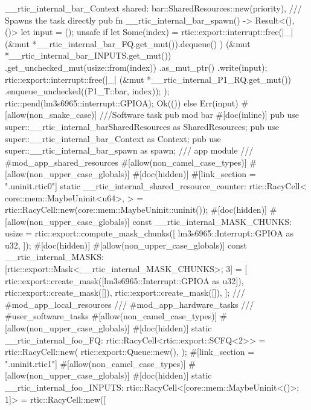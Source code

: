 {{{            __rtic_internal_bar_Context {
                shared: bar::SharedResources::new(priority),
            }
        }
    }
    /// Spawns the task directly
    pub fn __rtic_internal_bar_spawn() -> Result<(), ()> {
        let input = ();
        unsafe {
            if let Some(index) = rtic::export::interrupt::free(|_| {
                (&mut *__rtic_internal_bar_FQ.get_mut()).dequeue()
            }) {
                (&mut *__rtic_internal_bar_INPUTS.get_mut())
                    .get_unchecked_mut(usize::from(index))
                    .as_mut_ptr()
                    .write(input);
                rtic::export::interrupt::free(|_| {
                    (&mut *__rtic_internal_P1_RQ.get_mut())
                        .enqueue_unchecked((P1_T::bar, index));
                });
                rtic::pend(lm3s6965::interrupt::GPIOA);
                Ok(())
            } else {
                Err(input)
            }
        }
    }
    #[allow(non_snake_case)]
    ///Software task
    pub mod bar {
        #[doc(inline)]
        pub use super::__rtic_internal_barSharedResources as SharedResources;
        pub use super::__rtic_internal_bar_Context as Context;
        pub use super::__rtic_internal_bar_spawn as spawn;
    }
    /// app module
    /// #mod_app_shared_resources
    #[allow(non_camel_case_types)]
    #[allow(non_upper_case_globals)]
    #[doc(hidden)]
    #[link_section = ".uninit.rtic0"]
    static __rtic_internal_shared_resource_counter: rtic::RacyCell<
        core::mem::MaybeUninit<u64>,
    > = rtic::RacyCell::new(core::mem::MaybeUninit::uninit());
    #[doc(hidden)]
    #[allow(non_upper_case_globals)]
    const __rtic_internal_MASK_CHUNKS: usize = rtic::export::compute_mask_chunks([
        lm3s6965::Interrupt::GPIOA as u32,
    ]);
    #[doc(hidden)]
    #[allow(non_upper_case_globals)]
    const __rtic_internal_MASKS: [rtic::export::Mask<__rtic_internal_MASK_CHUNKS>; 3] = [
        rtic::export::create_mask([lm3s6965::Interrupt::GPIOA as u32]),
        rtic::export::create_mask([]),
        rtic::export::create_mask([]),
    ];
    /// #mod_app_local_resources
    /// #mod_app_hardware_tasks
    /// #user_software_tasks
    #[allow(non_camel_case_types)]
    #[allow(non_upper_case_globals)]
    #[doc(hidden)]
    static __rtic_internal_foo_FQ: rtic::RacyCell<rtic::export::SCFQ<2>> = rtic::RacyCell::new(
        rtic::export::Queue::new(),
    );
    #[link_section = ".uninit.rtic1"]
    #[allow(non_camel_case_types)]
    #[allow(non_upper_case_globals)]
    #[doc(hidden)]
    static __rtic_internal_foo_INPUTS: rtic::RacyCell<[core::mem::MaybeUninit<()>; 1]> = rtic::RacyCell::new([
}
